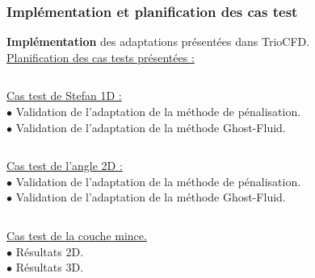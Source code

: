 \documentclass{beamer}
\begin{document}
\begin{frame}
	\frametitle{Implémentation et planification des cas test}
	\footnotesize
	\textbf{Implémentation} des adaptations présentées dans TrioCFD.\\
	\color{cea_rouge}\underline{Planification des cas tests présentées :}\color{cea_texte}\\
	\vspace{0.3cm}
	
	
\begin{columns}[c]
    \begin{column}{0.5 \textwidth}
    \underline{Cas test de Stefan 1D :}\\
    	$\bullet$ Validation de l'adaptation de la méthode de pénalisation.\\
    	$\bullet$ Validation de l'adaptation de la méthode Ghost-Fluid.\\
    	


\end{column}
    \begin{column}{0.5 \textwidth}
		\begin{tikzpicture}[scale = 0.6, every node/.style={scale=0.6}]
			
		\end{tikzpicture}

   \end{column}
   \end{columns}	
   
   	
\begin{columns}[c]
    \begin{column}{0.5 \textwidth}
       \underline{Cas test de l'angle 2D :}\\
        $\bullet$ Validation de l'adaptation de la méthode de pénalisation.\\
    	$\bullet$ Validation de l'adaptation de la méthode Ghost-Fluid.\\
    	
\end{column}
    \begin{column}{0.5 \textwidth}
    		\center \begin{tikzpicture}[scale = 0.2, every node/.style={scale=0.2}]
			
		\end{tikzpicture}


   \end{column}
\end{columns}	


	\begin{columns}[c]
    \begin{column}{0.5 \textwidth}
	\underline{ Cas test de la couche mince.}\\
	$\bullet$  Résultats 2D.\\
	$\bullet$ Résultats 3D.
	

\end{column}
\end{columns}
\end{frame}
\end{document}
